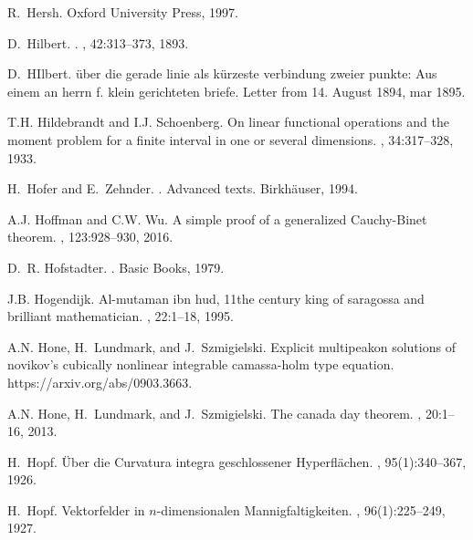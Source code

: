 \documentclass[12pt]{amsart}
\begin{document}
\begin{thebibliography}{100}
R.~Hersh.
\newblock Oxford University Press, 1997.

D.~Hilbert.
.
, 42:313--373, 1893.

D.~HIlbert.
\newblock \"uber die gerade linie als k\"urzeste verbindung zweier punkte: Aus
  einem an herrn f. klein gerichteten briefe.
\newblock Letter from 14. August 1894, mar 1895.

T.H. Hildebrandt and I.J. Schoenberg.
\newblock On linear functional operations and the moment problem for a finite
  interval in one or several dimensions.
, 34:317--328, 1933.

H.~Hofer and E.~Zehnder.
.
 Advanced texts. {Birkh\"auser}, 1994.

A.J. Hoffman and C.W. Wu.
\newblock A simple proof of a generalized {C}auchy-{B}inet theorem.
, 123:928--930, 2016.

D.~R. Hofstadter.
.
\newblock Basic Books, 1979.

J.B. Hogendijk.
\newblock Al-mutaman ibn hud, 11the century king of saragossa and brilliant
  mathematician.
, 22:1--18, 1995.

A.N. Hone, H.~Lundmark, and J.~Szmigielski.
\newblock Explicit multipeakon solutions of novikov's cubically nonlinear
  integrable camassa-holm type equation.
\newblock https://arxiv.org/abs/0903.3663.

A.N. Hone, H.~Lundmark, and J.~Szmigielski.
\newblock The canada day theorem.
, 20:1--16, 2013.

H.~Hopf.
\newblock \"{U}ber die {C}urvatura integra geschlossener {H}yperfl\"{a}chen.
, 95(1):340--367, 1926.

H.~Hopf.
\newblock Vektorfelder in {$n$}-dimensionalen {M}annigfaltigkeiten.
, 96(1):225--249, 1927.


\end{thebibliography}
\end{document}
